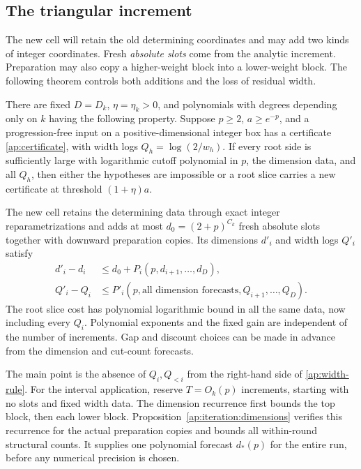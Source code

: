 \subsection{The triangular increment}

The new cell will retain the old determining coordinates and may add
two kinds of integer coordinates. Fresh \emph{absolute slots} come
from the analytic increment. Preparation may also copy a higher-weight
block into a lower-weight block. The following theorem controls both
additions and the loss of residual width.

\begin{theorem}\label{ap:increment}
There are fixed $D=D_k$, $\eta=\eta_k>0$, and polynomials with
degrees depending only on $k$ having the following property.
Suppose $p\ge2$, $a\ge e^{-p}$, and a progression-free input on a
positive-dimensional integer box has a certificate
\eqref{ap:certificate}, with width logs $Q_h=\log(2/w_h)$.
If every root side is sufficiently large with logarithmic cutoff
polynomial in $p$, the dimension data, and all $Q_h$, then either
the hypotheses are impossible or a root slice carries a new
certificate at threshold $(1+\eta)a$.

The new cell retains the determining data through exact integer
reparametrizations and adds at most $d_0=(2+p)^{C_k}$ fresh absolute
slots together with downward preparation copies. Its dimensions
$d'_i$ and width logs $Q'_i$ satisfy
\begin{align}
 d'_i-d_i
   &\le d_0+P_i(p,d_{i+1},\ldots,d_D),\label{ap:dimension-rule}\\
 Q'_i-Q_i
   &\le P'_i(p,\text{all dimension forecasts},Q_{i+1},\ldots,Q_D).
   \label{ap:width-rule}
\end{align}
The root slice cost has polynomial logarithmic bound in all the
same data, now including every $Q_i$. Polynomial exponents and the
fixed gain are independent of the number of increments. Gap and
discount choices can be made in advance from the dimension and
cut-count forecasts.
\end{theorem}

The main point is the absence of $Q_i,Q_{<i}$ from the right-hand side
of \eqref{ap:width-rule}. For the interval application, reserve
$T=O_k(p)$ increments, starting with no slots and fixed width data.
The dimension recurrence first bounds the top block, then each lower
block. Proposition~\ref{ap:iteration:dimensions} verifies this
recurrence for the actual preparation copies and bounds all
within-round structural counts. It supplies one polynomial forecast
$d_*(p)$ for the entire run, before any numerical precision is chosen.

